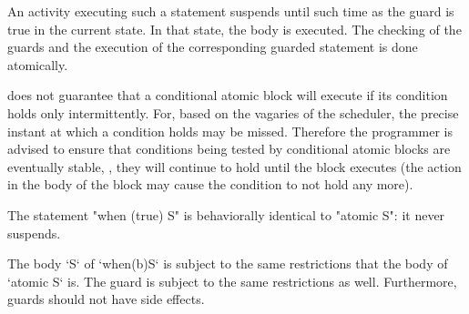 An activity executing such a statement suspends until such time as the  guard
is true in the current state. In that state, the 
body is executed. 
The checking of the guards and the execution of the corresponding
guarded statement is done atomically. 

\Xten{} does not guarantee that a conditional atomic block
will execute if its condition holds only intermittently. For, based on
the vagaries of the scheduler, the precise instant at which a
condition holds may be missed. Therefore the programmer is advised to
ensure that conditions being tested by conditional atomic blocks are
eventually stable, \ie, they will continue to hold until the block
executes (the action in the body of the block may cause the condition
to not hold any more).




The statement \xcd"when (true) S" is
behaviorally identical to \xcd"atomic S": it never suspends.

The body \xcd`S` of \xcd`when(b)S` is subject to the same restrictions that
the body of \xcd`atomic S` is.  The guard is subject to the same restrictions
as well.  Furthermore, guards should not have side effects.


